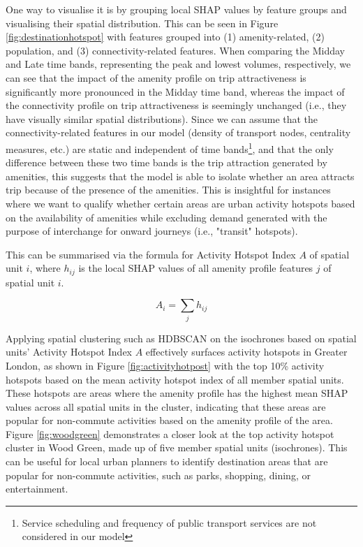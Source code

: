 One way to visualise it is by grouping local SHAP values by feature groups and visualising their spatial distribution. This can be seen in Figure \ref{fig:destinationhotspot} with features grouped into (1) amenity-related, (2) population, and (3) connectivity-related features. When comparing the Midday and Late time bands, representing the peak and lowest volumes, respectively, we can see that the impact of the amenity profile on trip attractiveness is significantly more pronounced in the Midday time band, whereas the impact of the connectivity profile on trip attractiveness is seemingly unchanged (i.e., they have visually similar spatial distributions). Since we can assume that the connectivity-related features in our model (density of transport nodes, centrality measures, etc.) are static and independent of time bands\footnote{Service scheduling and frequency of public transport services are not considered in our model}, and that the only difference between these two time bands is the trip attraction generated by amenities, this suggests that the model is able to isolate whether an area attracts trip because of the presence of the amenities. This is insightful for instances where we want to qualify whether certain areas are urban activity hotspots based on the availability of amenities while excluding demand generated with the purpose of interchange for onward journeys (i.e., "transit" hotspots). 

This can be summarised via the formula for Activity Hotspot Index $A$ of spatial unit $i$, where $h_{ij}$ is the local SHAP values of all amenity profile features $j$ of spatial unit $i$. 

$$A_i = \sum_{j} h_{ij}$$

Applying spatial clustering such as HDBSCAN on the isochrones based on spatial units' Activity Hotspot Index $A$ effectively surfaces activity hotspots in Greater London, as shown in Figure \ref{fig:activityhotpost} with the top 10\% activity hotspots based on the mean activity hotspot index of all member spatial units. These hotspots are areas where the amenity profile has the highest mean SHAP values across all spatial units in the cluster, indicating that these areas are popular for non-commute activities based on the amenity profile of the area. Figure \ref{fig:woodgreen} demonstrates a closer look at the top activity hotspot cluster in Wood Green, made up of five member spatial units (isochrones). This can be useful for local urban planners to identify destination areas that are popular for non-commute activities, such as parks, shopping, dining, or entertainment.

